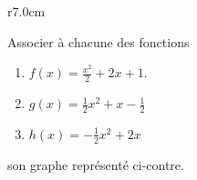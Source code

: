 
\begin{exercice}\label{exosmath-0271}

\begin{wrapfigure}{r}{7.0cm}
   \vspace{-3.5cm}        %
   \centering
   
\end{wrapfigure}

Associer à chacune des fonctions 
\begin{enumerate}
    \item
        \( f(x)=\frac{ x^2 }{2}+2x+1\).
\item
\( g(x)=\frac{ 1 }{2}x^2+x-\frac{ 1 }{2}\)
\item
\( h(x)=-\frac{ 1 }{2}x^2+2x\)
\end{enumerate}
son graphe représenté ci-contre.

\end{exercice}
